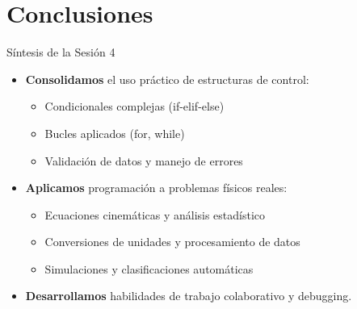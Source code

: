 \documentclass[10pt]{beamer}
\begin{document}
\section{Conclusiones}

\begin{frame}{Síntesis de la Sesión 4}
  \begin{itemize}
    \item \textbf{Consolidamos} el uso práctico de estructuras de control:
      \begin{itemize}
        \item Condicionales complejas (if-elif-else)
        \item Bucles aplicados (for, while)
        \item Validación de datos y manejo de errores
      \end{itemize}
    \item \textbf{Aplicamos} programación a problemas físicos reales:
      \begin{itemize}
        \item Ecuaciones cinemáticas y análisis estadístico
        \item Conversiones de unidades y procesamiento de datos
        \item Simulaciones y clasificaciones automáticas
      \end{itemize}
    \item \textbf{Desarrollamos} habilidades de trabajo colaborativo y debugging.
  \end{itemize}
\end{frame}
\end{document}
